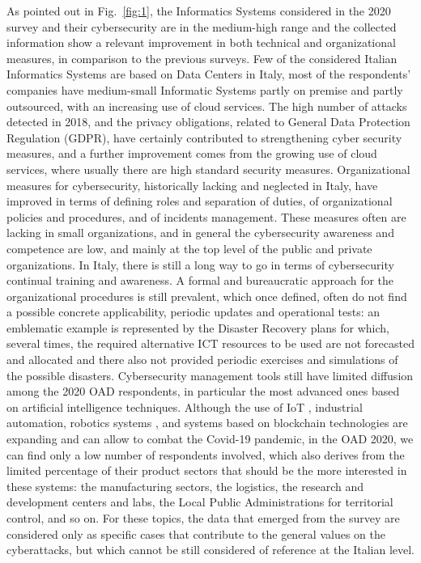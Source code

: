 \documentclass{easychair}
\begin{document}
As pointed out in Fig.~\ref{fig:1}, the Informatics Systems considered in the 2020 survey and their cybersecurity  are in the medium-high range and the collected information show a relevant 
improvement in both technical and organizational measures, in comparison to the previous surveys. Few of the considered Italian Informatics Systems are based on Data Centers in 
Italy, most of the respondents’ companies have medium-small Informatic Systems partly on premise and partly outsourced, with an increasing use of cloud services.
The high number of attacks detected in 2018, and the privacy obligations, related to General Data Protection Regulation (GDPR), have certainly contributed to strengthening cyber security measures, and a further improvement 
comes from the growing use of cloud services, where usually there are high standard security measures. Organizational measures for cybersecurity, historically lacking and neglected
in Italy, have improved in terms of defining roles and separation of duties, of organizational policies and procedures, and of incidents management. These measures often are lacking
in small organizations, and in general the cybersecurity awareness and competence are low, and mainly at the top level of the public and private organizations. In Italy, there is 
still a long way to go in terms of cybersecurity continual training and awareness. A formal and bureaucratic approach for the organizational procedures is still prevalent, which 
once defined, often do not find a possible concrete applicability, periodic updates and operational tests: an emblematic example is represented by the Disaster Recovery plans for 
which, several times, the required alternative ICT resources to be used are not forecasted and allocated and there also not provided periodic exercises and simulations of the 
possible disasters. Cybersecurity management tools still have limited diffusion among the 2020 OAD respondents, in particular the most advanced ones based on artificial intelligence
techniques. Although the use of IoT \cite{JK21}, industrial automation, robotics systems \cite{SGLMDXHKCZT21}, and systems based on blockchain technologies \cite{RMFF21} are expanding and can allow to combat the Covid-19 pandemic, in 
the OAD 2020, we can find only a low number of respondents involved, which also derives from the limited percentage of their product sectors that should be the more interested in these systems: the manufacturing sectors, the logistics, the research and 
development centers and labs, the Local Public Administrations for territorial control, and so on. For these topics, the data that emerged from the survey are considered only as 
specific cases that contribute to the general values on the cyberattacks, but which cannot be still considered of reference at the Italian level.
\end{document}
